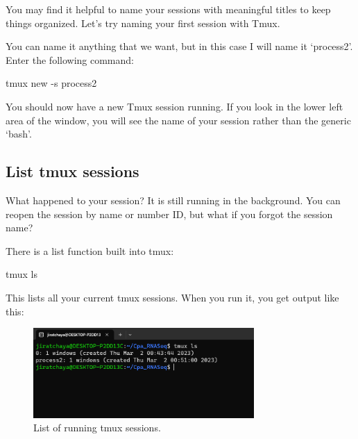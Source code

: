 \documentclass[
  letterpaper,
  DIV=11,
  numbers=noendperiod]{scrreprt}
\newenvironment{Shaded}{\begin{snugshade}}{\end{snugshade}}
\newcommand{\AttributeTok}[1]{\textcolor[rgb]{0.40,0.45,0.13}{#1}}
\newcommand{\ExtensionTok}[1]{\textcolor[rgb]{0.00,0.23,0.31}{#1}}
\newcommand{\NormalTok}[1]{\textcolor[rgb]{0.00,0.23,0.31}{#1}}
\begin{document}
You may find it helpful to name your sessions with meaningful titles to
keep things organized. Let's try naming your first session with Tmux.

You can name it anything that we want, but in this case I will name it
`process2'. Enter the following command:

\begin{Shaded}
\begin{Highlighting}[]
\ExtensionTok{tmux}\NormalTok{ new }\AttributeTok{{-}s}\NormalTok{ process2}
\end{Highlighting}
\end{Shaded}

You should now have a new Tmux session running. If you look in the lower
left area of the window, you will see the name of your session rather
than the generic `bash'.

\hypertarget{list-tmux-sessions}{%
\subsection*{List tmux sessions}\label{list-tmux-sessions}}

What happened to your session? It is still running in the background.
You can reopen the session by name or number ID, but what if you forgot
the session name?

There is a list function built into tmux:

\begin{Shaded}
\begin{Highlighting}[]
\ExtensionTok{tmux}\NormalTok{ ls}
\end{Highlighting}
\end{Shaded}

This lists all your current tmux sessions. When you run it, you get
output like this:

\begin{figure}

{\centering \includegraphics[width=0.75\textwidth,height=\textheight]{./assets/11_tmux_sessions.png}

}

\caption{List of running tmux sessions.}

\end{figure}
\end{document}
